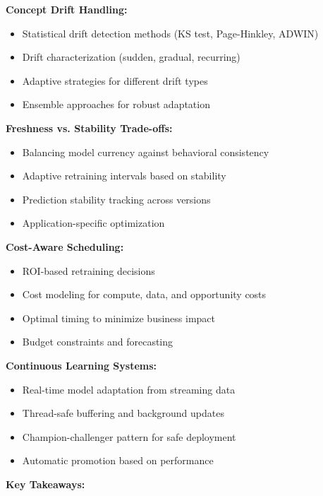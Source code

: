 \textbf{Concept Drift Handling:}
\begin{itemize}
    \item Statistical drift detection methods (KS test, Page-Hinkley, ADWIN)
    \item Drift characterization (sudden, gradual, recurring)
    \item Adaptive strategies for different drift types
    \item Ensemble approaches for robust adaptation
\end{itemize}

\textbf{Freshness vs. Stability Trade-offs:}
\begin{itemize}
    \item Balancing model currency against behavioral consistency
    \item Adaptive retraining intervals based on stability
    \item Prediction stability tracking across versions
    \item Application-specific optimization
\end{itemize}

\textbf{Cost-Aware Scheduling:}
\begin{itemize}
    \item ROI-based retraining decisions
    \item Cost modeling for compute, data, and opportunity costs
    \item Optimal timing to minimize business impact
    \item Budget constraints and forecasting
\end{itemize}

\textbf{Continuous Learning Systems:}
\begin{itemize}
    \item Real-time model adaptation from streaming data
    \item Thread-safe buffering and background updates
    \item Champion-challenger pattern for safe deployment
    \item Automatic promotion based on performance
\end{itemize}

\textbf{Key Takeaways:}

